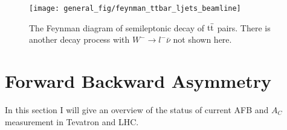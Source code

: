 \begin{figure}[hbt]
	\begin{center}
		\texttt{[image: general\_fig/feynman\_ttbar\_ljets\_beamline]}
		\caption{\small The Feynman diagram of semileptonic decay of $\mathrm{t}\bar{\mathrm{t}}$ pairs. There is another decay process with $W^-\rightarrow l^-\bar \nu$ not shown here.}
		\label{fig:TT_semileptonic}
	\end{center}
\end{figure}

 
\section{Forward Backward Asymmetry}
\label{sec:AFB}

In this section I will give an overview of the status of current AFB and $A_C$ measurement in Tevatron and LHC.
